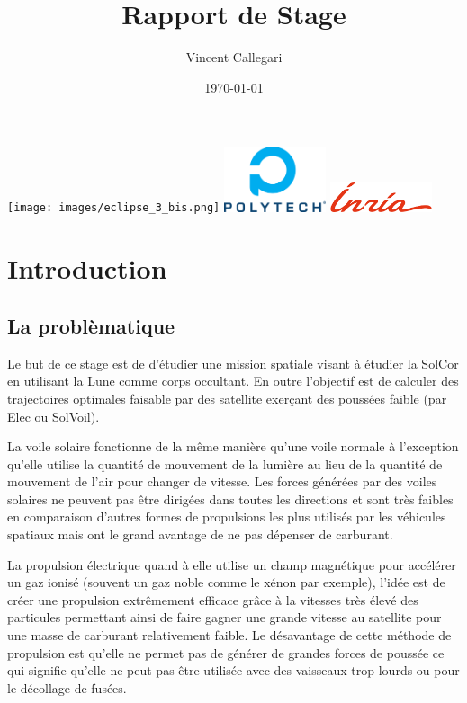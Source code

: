 \documentclass[12pt]{article} %
\title{Rapport de Stage} %
\author{Vincent Callegari} %
\date{\today} %
\begin{document}
		\maketitle
		\texttt{[image: images/eclipse\_3\_bis.png]}
		\vfill
		\includegraphics[width=3cm]{images/Logo_Reseau_Polytech.png} \hfill \includegraphics[width=3cm]{images/inria.png}
		\newpage
		\tableofcontents
		\newpage
		\section{Introduction}
		
		\subsection{La problèmatique}
		Le but de ce stage est de d'étudier une mission spatiale visant à étudier la \gls{SolCor} en utilisant la Lune comme corps occultant. En outre l'objectif est de calculer des trajectoires optimales faisable par des satellite exerçant des poussées faible (par \gls{Elec} ou \gls{SolVoil}).
		
		La voile solaire fonctionne de la même manière qu'une voile normale à l'exception qu'elle utilise la quantité de mouvement de la lumière au lieu de la quantité de mouvement de l'air pour changer de vitesse. Les forces générées par des voiles solaires ne peuvent pas être dirigées dans toutes les directions et sont très faibles en comparaison d'autres formes de propulsions les plus utilisés par les véhicules spatiaux mais ont le grand avantage de ne pas dépenser de carburant.
		
		La propulsion électrique quand à elle utilise un champ magnétique pour accélérer un gaz ionisé (souvent un gaz noble comme le xénon par exemple), l'idée est de créer une propulsion extrêmement efficace grâce à la vitesses très élevé des particules permettant ainsi de faire gagner une grande vitesse au satellite pour une masse de carburant relativement faible. Le désavantage de cette méthode de propulsion est qu'elle ne permet pas de générer de grandes forces de poussée ce qui signifie qu'elle ne peut pas être utilisée avec des vaisseaux trop lourds ou pour le décollage de fusées.
		
\end{document}
